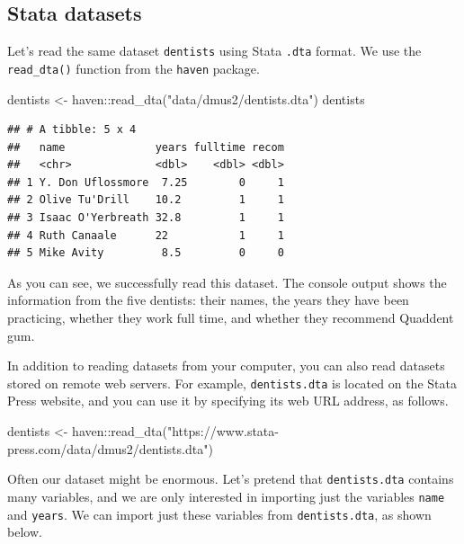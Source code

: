 \documentclass[
]{book}
\newenvironment{Shaded}{\begin{snugshade}}{\end{snugshade}}
\newcommand{\FunctionTok}[1]{\textcolor[rgb]{0.00,0.00,0.00}{#1}}
\newcommand{\NormalTok}[1]{#1}
\newcommand{\OtherTok}[1]{\textcolor[rgb]{0.56,0.35,0.01}{#1}}
\newcommand{\SpecialCharTok}[1]{\textcolor[rgb]{0.00,0.00,0.00}{#1}}
\newcommand{\StringTok}[1]{\textcolor[rgb]{0.31,0.60,0.02}{#1}}
\begin{document}
\hypertarget{stata-datasets}{%
\subsection{Stata datasets}\label{stata-datasets}}

Let's read the same dataset \texttt{dentists} using Stata \texttt{.dta} format. We use the \texttt{read\_dta()} function from the \texttt{haven} package.

\begin{Shaded}
\begin{Highlighting}[]
\NormalTok{dentists }\OtherTok{\textless{}{-}}\NormalTok{ haven}\SpecialCharTok{::}\FunctionTok{read\_dta}\NormalTok{(}\StringTok{"data/dmus2/dentists.dta"}\NormalTok{)}
\NormalTok{dentists}
\end{Highlighting}
\end{Shaded}

\begin{verbatim}
## # A tibble: 5 x 4
##   name              years fulltime recom
##   <chr>             <dbl>    <dbl> <dbl>
## 1 Y. Don Uflossmore  7.25        0     1
## 2 Olive Tu'Drill    10.2         1     1
## 3 Isaac O'Yerbreath 32.8         1     1
## 4 Ruth Canaale      22           1     1
## 5 Mike Avity         8.5         0     0
\end{verbatim}

As you can see, we successfully read this dataset. The console output shows the information from the five dentists: their names, the years they have been practicing, whether they work full time, and whether they recommend Quaddent gum.

In addition to reading datasets from your computer, you can also read datasets stored on remote web servers. For example, \texttt{dentists.dta} is located on the Stata Press website, and you can use it by specifying its web URL address, as follows.

\begin{Shaded}
\begin{Highlighting}[]
\NormalTok{dentists }\OtherTok{\textless{}{-}}\NormalTok{ haven}\SpecialCharTok{::}\FunctionTok{read\_dta}\NormalTok{(}\StringTok{"https://www.stata{-}press.com/data/dmus2/dentists.dta"}\NormalTok{)}
\end{Highlighting}
\end{Shaded}

Often our dataset might be enormous. Let's pretend that \texttt{dentists.dta} contains many variables, and we are only interested in importing just the variables \texttt{name} and \texttt{years}. We can import just these variables from \texttt{dentists.dta}, as shown below.
\end{document}
